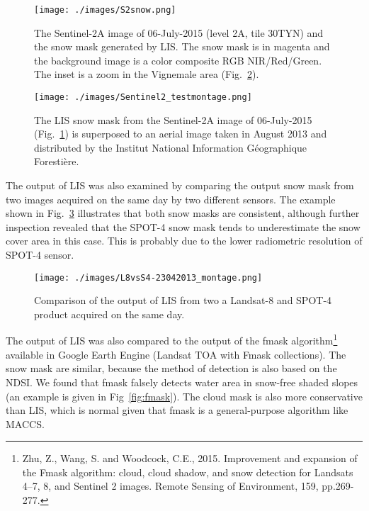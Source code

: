 \documentclass[a4paper]{article}
\begin{document}
\begin{figure}[h]
 \centering
 \texttt{[image: ./images/S2snow.png]}
 \caption{The Sentinel-2A image of 06-July-2015 (level 2A, tile 30TYN) and the snow mask generated by LIS. The snow mask is in magenta and the background image is a color composite RGB NIR/Red/Green. The inset is a zoom in the Vignemale area (Fig.~\ref{fig:S2snowzoom}).}
 \label{fig:S2snow}
\end{figure}

\begin{figure}[h]
 \centering
 \texttt{[image: ./images/Sentinel2\_testmontage.png]}
 \caption{The LIS snow mask from the Sentinel-2A image of 06-July-2015 (Fig.~\ref{fig:S2snow}) is superposed to an aerial image taken in August 2013 and distributed by the Institut National Information Géographique Forestière.}
 \label{fig:S2snowzoom}
\end{figure}

The output of LIS was also examined by comparing the output snow mask from two images acquired on the same day by two different sensors. The example shown in Fig.~\ref{fig:L8vsS4-23042013} illustrates that both snow masks are consistent, although further inspection revealed that the SPOT-4 snow mask tends to underestimate the snow cover area in this case. This is probably due to the lower radiometric resolution of SPOT-4 sensor.

\begin{figure}[h]
 \centering
 \texttt{[image: ./images/L8vsS4-23042013\_montage.png]}
 \caption{Comparison of the output of LIS from two a Landsat-8 and SPOT-4 product acquired on the same day.}
 \label{fig:L8vsS4-23042013}
\end{figure}

The output of LIS was also compared to the output of the fmask algorithm\footnote{Zhu, Z., Wang, S. and Woodcock, C.E., 2015. Improvement and expansion of the Fmask algorithm: cloud, cloud shadow, and snow detection for Landsats 4–7, 8, and Sentinel 2 images. Remote Sensing of Environment, 159, pp.269-277.} available in Google Earth Engine (Landsat TOA with Fmask collections). The snow mask are similar, because the method of detection is also based on the NDSI. We found that fmask falsely detects water area in snow-free shaded slopes (an example is given in Fig~\ref{fig:fmask}). The cloud mask is also more conservative than LIS, which is normal given that fmask is a general-purpose algorithm like MACCS. 
\end{document}
